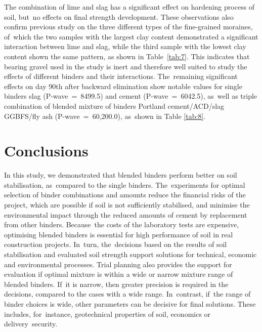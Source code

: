 \documentclass[materials,article,accept,pdftex,moreauthors]{Definitions/mdpi}
\begin{document}
The combination of lime and slag has a significant effect on hardening process of soil, but~no effects on  final strength development. These observations also confirm previous study \cite{Lindh2001} on the three different types of the fine-grained moraines, of~which the two samples with the largest clay content demonstrated a significant interaction between lime and slag, while the third sample with the lowest clay content shown the same pattern, as shown in Table~\ref{tab:7}. This indicates that bearing gravel used in the study is inert and therefore well suited to study the effects of different binders and their interactions. The~remaining significant effects on day {90}th after backward elimination show notable values for single binders slag (P-wave~=~8499.5) and cement (P-wave~=~6042.5), as~well as triple combination of blended mixture of binders Portland cement/ACD/slag GGBFS/fly ash (P-wave~{=~60,200.0}), as~shown in Table \ref{tab:8}. 

\section{Conclusions}
In this study, we demonstrated that blended binders perform better on soil stabilisation, as~compared to the single binders. The~experiments for optimal selection of binder combinations and amounts reduce the financial risks of the project, which are possible if soil is not sufficiently stabilised, and minimise the environmental impact through the reduced amounts of cement by replacement from other binders. Because~the costs of the laboratory tests are expensive, optimising blended binders is essential for high performance of soil in real  construction projects. In~turn, the~decisions based on the results of soil stabilisation and evaluated soil strength support solutions for technical, economic and environmental processes. Trial planning also provides the support for evaluation if optimal mixture is within a wide or narrow mixture range of blended binders. If~it is narrow, then greater precision is required in the decisions, compared to the cases with a wide range. In~contrast, if~the range of binder choices is wide, other parameters can be decisive for final solutions. These includes, for~instance, geotechnical properties of soil, economics or delivery~security.
\end{document}
